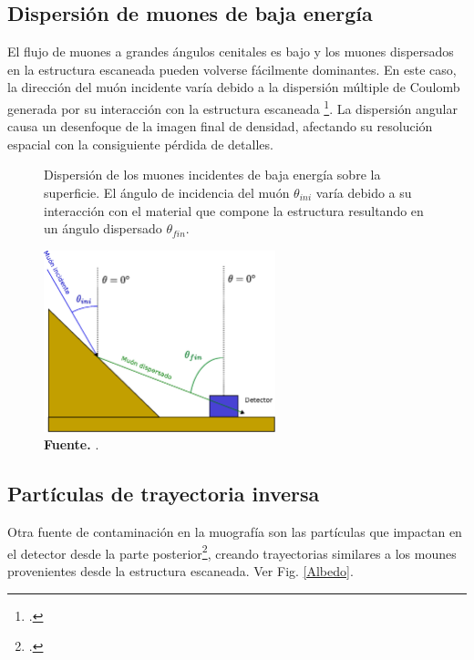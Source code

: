 \subsection{Dispersión de muones de baja energía}

El flujo de muones a grandes ángulos cenitales es bajo y los muones dispersados en la estructura escaneada pueden volverse fácilmente dominantes. En este caso, la dirección del muón incidente varía debido a la dispersión múltiple de Coulomb generada por su interacción con la estructura escaneada \footcite{bonechi2020atmospheric}. La dispersión angular  causa un desenfoque de la imagen final de densidad, afectando su resolución espacial con la consiguiente pérdida de detalles.

\begin{figure}[H]
    \begin{center}
        \caption[Dispersión de los muones incidentes de baja energía sobre la superficie]{Dispersión de los muones incidentes de baja energía sobre la superficie. El ángulo de incidencia del muón $\theta_{ini}$ varía debido a su interacción con el material que compone la estructura resultando en un ángulo dispersado $\theta_{fin}$.}
        \includegraphics[width=0.6\textwidth]{Figures/imagenes/Muon_scattering.eps}
        \caption*{\textbf{Fuente.} \cite{jesusP}. }
        \label{Scattering}
    \end{center}
\end{figure}


\subsection{Partículas de trayectoria inversa}

Otra fuente de contaminación en la muografía son las partículas que impactan en el detector desde la parte posterior\footcite{Nishiyama2014}, creando trayectorias similares a los mounes provenientes desde la estructura escaneada. Ver Fig. \ref{Albedo}.


